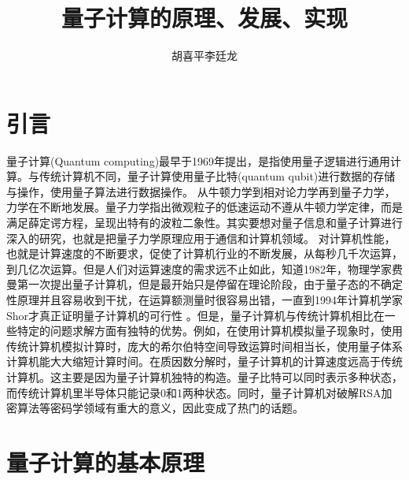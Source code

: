 \documentclass{article}
\author{胡喜平\quad 李廷龙}
\title{量子计算的原理、发展、实现}
\begin{document}
\maketitle
\section{引言}
\label{sec:label}
量子计算(Quantum computing)最早于1969年提出，是指使用量子逻辑进行通用计算。与传统计算机不同，量子计算使用量子比特(quantum qubit)进行数据的存储与操作，使用量子算法进行数据操作。
\newline
从牛顿力学到相对论力学再到量子力学，力学在不断地发展。量子力学指出微观粒子的低速运动不遵从牛顿力学定律，而是满足薛定谔方程，呈现出特有的波粒二象性。其实要想对量子信息和量子计算进行深入的研究，也就是把量子力学原理应用于通信和计算机领域。
\newline
对计算机性能，也就是计算速度的不断要求，促使了计算机行业的不断发展，从每秒几千次运算，到几亿次运算。但是人们对运算速度的需求远不止如此，知道1982年，物理学家费曼第一次提出量子计算机，但是最开始只是停留在理论阶段，由于量子态的不确定性原理并且容易收到干扰，在运算额测量时很容易出错，一直到1994年计算机学家Shor才真正证明量子计算机的可行性 。但是，量子计算机与传统计算机相比在一些特定的问题求解方面有独特的优势。例如，在使用计算机模拟量子现象时，使用传统计算机模拟计算时，庞大的希尔伯特空间导致运算时间相当长，使用量子体系计算机能大大缩短计算时间。在质因数分解时，量子计算机的计算速度远高于传统计算机。这主要是因为量子计算机独特的构造。量子比特可以同时表示多种状态，而传统计算机里半导体只能记录0和1两种状态。同时，量子计算机对破解RSA加密算法等密码学领域有重大的意义，因此变成了热门的话题。

\section{量子计算的基本原理}
\label{sec:label}
\end{document}
